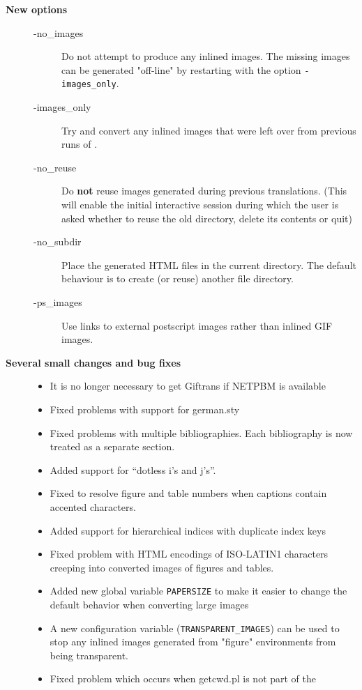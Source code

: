 \begin{description}
\item[{\bf New options}] \hfill
\begin{description}
\item [-no\_images]
Do not attempt to produce any inlined images. 
The missing images can be generated "off-line" by restarting \latextohtml
with the option {\tt -images\_only}.
\item [-images\_only]
Try and convert any inlined images that were left over from previous
runs of \latextohtml. 
\item [-no\_reuse]
Do {\bf not} reuse images generated during previous translations.
(This will enable the initial interactive session during which the user is
asked whether to reuse the old directory, delete its contents or quit)
\item [-no\_subdir]
Place the generated HTML files  in the 
current directory. The default behaviour is to create (or reuse)
another file directory.
\item [-ps\_images]
Use links to external postscript images rather than inlined GIF images.
\end{description}
\item[{\bf Several small changes and bug fixes}] \hfill
\begin{itemize}
\item It is no longer necessary to get {\fn Giftrans} if {\fn NETPBM}
is available
\item Fixed problems with support for {\fn german.sty}
\item Fixed problems with multiple bibliographies. Each bibliography
is now treated as a separate section.
\item Added support for ``dotless i's and j's''.
\item  Fixed to resolve figure and table numbers when captions contain
accented characters.
\item Added support for hierarchical indices with duplicate index keys
\item Fixed problem with HTML encodings of ISO-LATIN1 characters   
creeping into converted images of figures and tables.
\item  Added new global variable {\tt PAPERSIZE}
to make it easier to change the default behavior when converting large images
\item A new configuration variable ({\tt TRANSPARENT\_IMAGES}) can be 
used to stop any inlined images generated from "figure" environments
from being transparent.
\item Fixed problem which occurs when {\fn getcwd.pl} is not part of the

\end{itemize}
\end{description}
